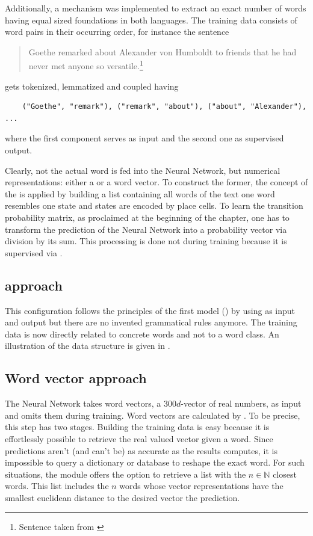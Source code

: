%
Additionally, a mechanism was implemented to extract an exact number of words having equal sized foundations in both languages. The training data consists of word pairs in their occurring order, for instance the sentence
\begin{quote}
	Goethe remarked about Alexander von Humboldt to friends that he had never met anyone so versatile.\footnote{Sentence taken from \cite{Wulf16ION}} %
\end{quote}
gets tokenized, lemmatized and coupled having
\begin{verbatim}
	("Goethe", "remark"), ("remark", "about"), ("about", "Alexander"), ...
\end{verbatim}
where the first component serves as input and the second one as supervised output.

Clearly, not the actual word is fed into the Neural Network, but numerical representations: either a \onehot{} or a word vector. To construct the former, the concept of the \cognitiveroom{} is applied by building a list containing all words of the text \ie one word resembles one state and states are encoded by place cells. To learn the transition probability matrix, as proclaimed at the beginning of the chapter, one has to transform the prediction of the Neural Network into a probability vector via division by its sum. This processing is done not during training because it is supervised via .


\subsection{\onehot{} approach} \label{subsubsec: onehot approach}
This configuration follows the principles of the first model () by using  as input and output but there are no invented grammatical rules anymore. The training data is now directly related to concrete words and not to a word class. An illustration of the data structure is given in \figref{\ref{fig: text model graph ohe w2v}}.


\subsection{Word vector approach} \label{subsubsec: word vector approach}
The Neural Network takes word vectors, a $ 300d $-vector of real numbers, as input and omits them during training. Word vectors are calculated by \spacy{}. To be precise, this step has two stages. Building the training data is easy because it is effortlessly possible to retrieve the real valued vector given a word. Since predictions aren't (and can't be) as accurate as the results \spacy{} computes, it is impossible to query a dictionary or database to reshape the exact word. For such situations, the module offers the option to retrieve a list with the $ n \in \mathbb{N} $ closest words. This list includes the $ n $ words whose vector representations have the smallest euclidean distance to the desired vector \ie the prediction.


